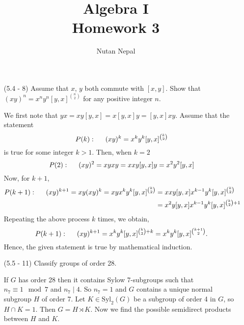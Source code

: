 \documentclass[12pt]{article}
\title{Algebra I\\
\large Homework 3
}
\author{Nutan Nepal}
\begin{document}
\maketitle
\makebox[\linewidth]{\rule{190mm}{.5pt}}
\vspace{0mm}
\begin{enumerate}

\item[(5.4 - 8)] Assume that $x$, $y$ both commute with
    $[x, y]$. Show that $(xy)^n = x^ny^n[y, x]^{n\choose 2}$
    for any positive integer $n$.
\begin{mybox}
    
    We first note that $yx=xy[y,x]=x[y,x]y=[y,x]xy$.
    Assume that the statement
    $$P(k):\hspace*{5mm}(xy)^k = x^ky^k[y, x]^{k\choose 2}$$
    is true for some integer $k>1$. Then, when $k=2$
    $$P(2):\hspace*{5mm}(xy)^2=xyxy=xxy[y,x]y=x^2y^2[y,x]$$
    Now, for $k+1$,
    \begin{align*}
       P(k+1):\hspace*{5mm}
       (xy)^{k+1}=xy(xy)^k=xyx^ky^k[y, x]^{k\choose 2}
    &=xxy[y,x]x^{k-1}y^k[y,x]^{k\choose 2}\\
    &=x^2y[y,x]x^{k-1}y^k[y,x]^{{k\choose 2}+1}
    \end{align*}
    Repeating the above process $k$ times, we obtain,
    $$P(k+1):\hspace*{5mm}
    (xy)^{k+1}=
    x^ky^k[y,x]^{{k\choose 2}+k}=x^ky^k[y,x]^
    {{k+1\choose 2}}.$$
    Hence, the given statement is true by mathematical
    induction.
\end{mybox}

\item[(5.5 - 11)] Classify groups of order 28.

\begin{mybox}

    If $G$ has order 28 then it contains Sylow
    7-subgroups such that $n_7\equiv 1\mod{7}$ and
    $n_7\mid 4$. So $n_7=1$ and $G$ contains a unique
    normal subgroup $H$ of order 7. Let $K\in
    \text{Syl}_2(G)$ be a
    subgroup of order 4 in $G$, so $H\cap K=1$. Then
    $G=H\rtimes K$. Now we find the possible semidirect
    products between $H$ and $K$.


\end{mybox}
\end{enumerate}
\end{document}
